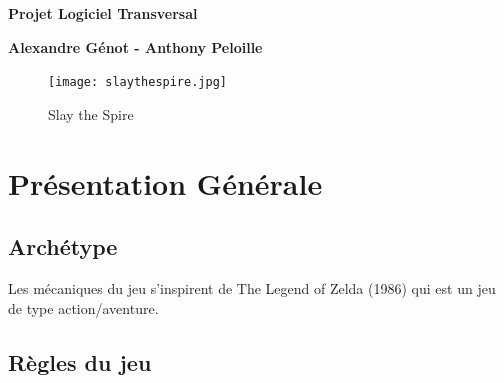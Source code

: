 \documentclass[a4paper,12pt]{article}
\begin{document}
\thispagestyle{empty}

\begin{titlepage}

\vspace*{2cm}

\begin{center}\textbf{\Huge Projet Logiciel Transversal}\end{center}{\Large \par}

\begin{center}\textbf{\large Alexandre Génot - Anthony Peloille}\end{center}{\large \par}

\vspace{2cm}

\begin{figure}[h]
\begin{center}
\texttt{[image: slaythespire.jpg]}
\caption{\label{Slay the Spire}Slay the Spire}
\end{center}
\end{figure}

\clearpage

{\small
\tableofcontents
}

\end{titlepage}

\clearpage
\section{Présentation Générale}

\subsection{Archétype}

Les mécaniques du jeu s'inspirent de The Legend of Zelda (1986) qui est un jeu de type action/aventure.

\subsection{Règles du jeu}
\end{document}
